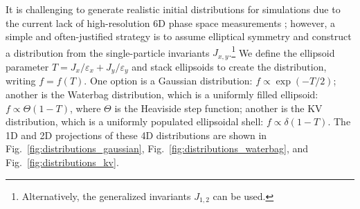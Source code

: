 It is challenging to generate realistic initial distributions for simulations due to the current lack of high-resolution 6D phase space measurements \cite{Lund2009, Ruisard2020}; however, a simple and often-justified strategy is to assume elliptical symmetry and construct a distribution from the single-particle invariants $J_{x,y}$.\footnote{Alternatively, the generalized invariants $J_{1, 2}$ can be used.} We define the ellipsoid parameter $T = {J_x}/{\varepsilon_x} + {J_y}/{\varepsilon_y}$ and stack ellipsoids to create the distribution, writing $f = f(T)$. One option is a Gaussian distribution: $f \propto \exp(-T/2)$; another is the Waterbag distribution, which is a uniformly filled ellipsoid: $f \propto \Theta(1 - T)$, where $\Theta$ is the Heaviside step function; another is the KV distribution, which is a uniformly populated ellipsoidal shell: $f \propto \delta(1 - T)$. The 1D and 2D projections of these 4D distributions are shown in Fig.~\ref{fig:distributions_gaussian}, Fig.~\ref{fig:distributions_waterbag}, and Fig.~\ref{fig:distributions_kv}. 
%
